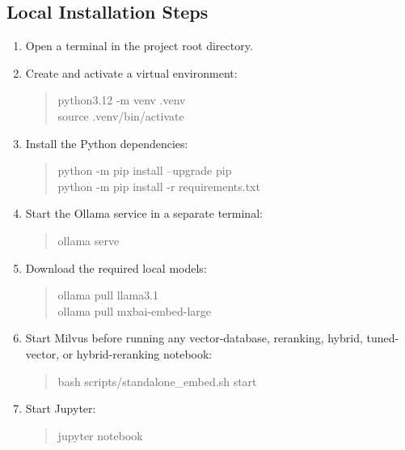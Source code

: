 \subsection*{Local Installation Steps}

\begin{enumerate}
    \item Open a terminal in the project root directory.
    \item Create and activate a virtual environment:

    \begin{quote}
    \small\ttfamily
    python3.12 -m venv .venv\\
    source .venv/bin/activate
    \end{quote}

    \item Install the Python dependencies:

    \begin{quote}
    \small\ttfamily
    python -m pip install --upgrade pip\\
    python -m pip install -r requirements.txt
    \end{quote}

    \item Start the Ollama service in a separate terminal:

    \begin{quote}
    \small\ttfamily
    ollama serve
    \end{quote}

    \item Download the required local models:

    \begin{quote}
    \small\ttfamily
    ollama pull llama3.1\\
    ollama pull mxbai-embed-large
    \end{quote}

    \item Start Milvus before running any vector-database, reranking, hybrid, tuned-vector, or hybrid-reranking notebook:

    \begin{quote}
    \small\ttfamily
    bash scripts/standalone\_embed.sh start
    \end{quote}

    \item Start Jupyter:

    \begin{quote}
    \small\ttfamily
    jupyter notebook
    \end{quote}
\end{enumerate}

